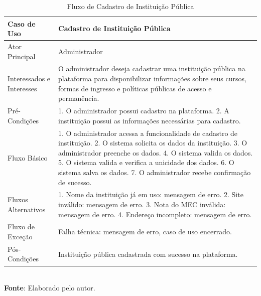 \begin{table}[h!]
\centering
\caption{Fluxo de Cadastro de Instituição Pública}
\begin{tabular}{|m{4cm}|m{11cm}|}
\hline
\textbf{Caso de Uso}   & \textbf{Cadastro de Instituição Pública} \\
\hline
Ator Principal & Administrador\\
\hline
Interessados e Interesses & O administrador deseja cadastrar uma instituição pública na plataforma para disponibilizar informações sobre seus cursos, formas de ingresso e políticas públicas de acesso e permanência. \\
\hline
Pré-Condições & 

1. O administrador possui cadastro na plataforma.
2. A instituição possui as informações necessárias para cadastro.
\\
\hline
Fluxo Básico & 

1. O administrador acessa a funcionalidade de cadastro de instituição.
2. O sistema solicita os dados da instituição.
3. O administrador preenche os dados.
4. O sistema valida os dados.
5. O sistema valida e verifica a unicidade dos dados.
6. O sistema salva os dados.
7. O administrador recebe confirmação de sucesso.
\\
\hline
Fluxos Alternativos & 

1. Nome da instituição já em uso: mensagem de erro.
2. Site inválido: mensagem de erro.
3. Nota do MEC inválida: mensagem de erro.
4. Endereço incompleto: mensagem de erro.
\\
\hline
Fluxo de Exceção & Falha técnica: mensagem de erro, caso de uso encerrado. \\
\hline
Pós-Condições & Instituição pública cadastrada com sucesso na plataforma. \\
\hline
\end{tabular}
\label{table:casos-de-uso}
\\[1ex]
\footnotesize \textbf{Fonte}: Elaborado pelo autor.
\end{table}

